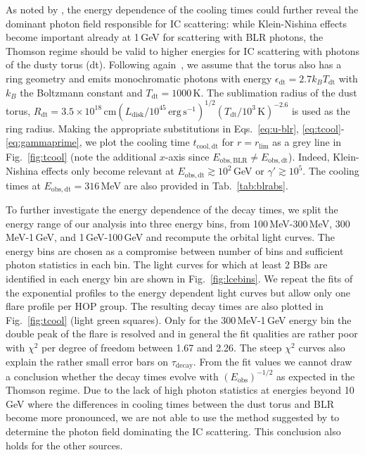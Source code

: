 \documentclass[twocolumn,linenumbers]{aastex62}
\begin{document}
  
As noted by \citet{2012ApJ...758L..15D}, the energy dependence of the cooling times could  further reveal the dominant photon field responsible for IC scattering: while Klein-Nishina effects become important already at 1\,GeV for scattering with BLR photons, the Thomson regime should be valid to higher energies for IC scattering with photons of the dusty torus (dt). 
Following again~\citet{finke2016}, we assume that the torus also has a ring geometry and emits monochromatic photons with energy $\epsilon_\mathrm{dt} = 2.7 k_B T_\mathrm{dt}$ with $k_B$ the Boltzmann constant and $T_\mathrm{dt} = 1000\,$K. 
The sublimation radius of the dust torus, $R_\mathrm{dt} = 3.5\times10^{18}\,\mathrm{cm}(L_\mathrm{disk}/10^{45}\,\mathrm{erg}\,\mathrm{s}^{-1})^{1/2}(T_\mathrm{dt}/10^3\,\mathrm{K})^{-2.6}$ is used as the ring radius. 
Making the appropriate substitutions in Eqs.~\ref{eq:u-blr}, \ref{eq:tcool}-\ref{eq:gammaprime}, we plot the cooling time $t_\mathrm{cool,dt}$ for $r = r_\mathrm{lim}$ as a grey line in Fig.~\ref{fig:tcool} (note the additional $x$-axis since $E_\mathrm{obs, BLR} \neq E_\mathrm{obs,dt}$). 
Indeed, Klein-Nishina effects only become relevant at $E_\mathrm{obs,dt} \gtrsim 10^2\,$GeV or $\gamma' \gtrsim 10^5$. The cooling times at $E_\mathrm{obs,dt} = 316\,$MeV are also provided in Tab.~\ref{tab:blrabs}.

To further investigate the energy dependence of the decay times, we split the energy range of our analysis into three energy bins, 
 from 100\,MeV-300\,MeV, 300\,MeV-1\,GeV, and 1\,GeV-100\,GeV and recompute the orbital light curves.
The energy bins are chosen as a compromise between number of bins and sufficient photon statistics in each bin. 
The light curves for which at least 2 BBs are identified in each energy bin are shown in Fig.~\ref{fig:lcebins}.
We repeat the fits of the exponential profiles to the energy dependent light curves but allow only one flare profile per HOP group. 
The resulting decay times are also plotted in Fig.~\ref{fig:tcool} (light green squares). Only for the 300\,MeV-1\,GeV energy bin the double peak of the flare is resolved and in general the fit qualities are rather poor with $\chi^2$ per degree of freedom between 1.67 and 2.26.
The steep $\chi^2$ curves also explain the rather small error bars on $\tau_\mathrm{decay}$. 
From the fit values we cannot draw a conclusion whether the decay times evolve with $(E_\mathrm{obs})^{-1/2}$ as expected in the Thomson regime.
Due to the lack of high photon statistics at energies beyond 10\,GeV where the differences in cooling times between the dust torus and BLR become more pronounced, we are not able to use the method suggested by \citet{2012ApJ...758L..15D} to determine the photon field dominating the IC scattering. 
This conclusion also holds for the other sources. 
\end{document}
